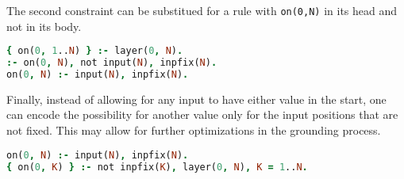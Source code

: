 The second constraint can be substitued for a rule with \texttt{on(0,N)} %
in its head and not in its body.

\begin{code}
\begin{lstlisting}[language=Prolog, numbers=none]
{ on(0, 1..N) } :- layer(0, N).
:- on(0, N), not input(N), inpfix(N).
on(0, N) :- input(N), inpfix(N).
\end{lstlisting}
    \caption{Encoding of input region based on fixed bits using rule and constraint}\label{enc:fixed_input}
\end{code}

Finally, instead of allowing for any input to have either value in the start,
one can encode the possibility for another value only for the input positions
that are not fixed. This may allow for further optimizations in the grounding process.

\begin{code}
\begin{lstlisting}[language=Prolog, numbers=none]
on(0, N) :- input(N), inpfix(N).
{ on(0, K) } :- not inpfix(K), layer(0, N), K = 1..N.
\end{lstlisting}
    \caption{Encoding of input region based on fixed bits using rule for fixed bits and choice for unfixed bits}\label{enc:fixed_direct}
\end{code}
